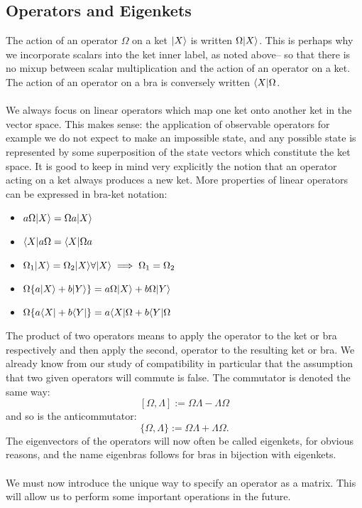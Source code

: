 \subsection{Operators and Eigenkets}
The action of an operator $\Omega$ on a ket $|X\rangle$ is written $\Omega|X\rangle$. This is perhaps why we incorporate scalars into the ket inner label, as noted above-- so that there is no mixup between scalar multiplication and the action of an operator on a ket. The action of an operator on a bra is conversely written $\langle X|\Omega$.
\\\\
We always focus on linear operators which map one ket onto another ket in the vector space. This makes sense: the application of observable operators for example we do not expect to make an impossible state, and any possible state is represented by some superposition of the state vectors which constitute the ket space. It is good to keep in mind  very explicitly the notion that an operator acting on a ket always produces a new ket. More properties of linear operators can be expressed in bra-ket notation:
\begin{itemize}
    \item $a\Omega|X\rangle=\Omega a|X\rangle$
    \item $\langle X|a\Omega=\langle X|\Omega a$
    \item $\Omega_{1}|X\rangle=\Omega_{2}|X\rangle \forall|X\rangle\implies\Omega_{1}=\Omega_{2}$
    \item $\Omega\{a|X\rangle+b|Y\rangle\}=a\Omega|X\rangle+b\Omega|Y\rangle$
    \item $\Omega\{a\langle X|+b\langle Y|\}=a\langle X|\Omega+b\langle Y|\Omega$
\end{itemize}
The product of two operators means to apply the  operator to the ket or bra respectively and then apply the second,  operator to the resulting ket or bra. We already know from our study of compatibility in particular that the assumption that two given operators will commute is false. The commutator is denoted the same way:
$$
[\Omega, \Lambda]:=\Omega\Lambda-\Lambda\Omega
$$
and so is the anticommutator:
$$
\{\Omega, \Lambda\}:=\Omega\Lambda+\Lambda\Omega.
$$
The eigenvectors of the operators will now often be called eigenkets, for obvious reasons, and the name eigenbras follows for bras in bijection with eigenkets. 
\\\\
We must now introduce the unique way to specify an operator as a matrix. This will allow us to perform some important operations in the future. 
